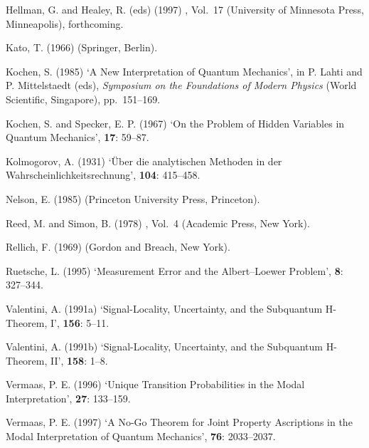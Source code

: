 \documentclass[12pt]{article}
\begin{document}
\begin{thebibliography}{10}
Hellman, G. and Healey, R. (eds) (1997)
, Vol.~17 (University of
Minnesota Press, Minneapolis), forthcoming.

Kato, T.  (1966)
(Springer, Berlin).

Kochen, S.  (1985)
\newblock `A New Interpretation of Quantum Mechanics',
\newblock in P. Lahti and P. Mittelstaedt (eds),
{\em Symposium on the Foundations of Modern Physics}
\newblock (World Scientific, Singapore), \mbox{pp. 151--169}.

Kochen, S. and Specker, E. P. (1967)
\newblock `On the Problem of Hidden Variables in Quantum Mechanics',
 {\bf 17}: 59--87.

Kolmogorov, A. (1931)
\newblock `\"Uber die analytischen Methoden in der
Wahrscheinlichkeitsrechnung',
 {\bf 104}: 415--458.

Nelson, E. (1985)
\newblock (Princeton University Press, Princeton).

Reed, M. and Simon, B.  (1978)
, Vol.~4
(Academic Press, New York).

Rellich, F. (1969)
 (Gordon and
Breach, New York).

Ruetsche, L.  (1995)
\newblock `Measurement Error and the Albert--Loewer Problem',
 {\bf 8}: 327--344.

Valentini, A. (1991a)
\newblock `Signal-Locality, Uncertainty, and the Subquantum H-Theorem, I',
 {\bf 156}: 5--11.

Valentini, A. (1991b)
\newblock `Signal-Locality, Uncertainty, and the Subquantum H-Theorem, II',
 {\bf 158}: 1--8.

Vermaas, P. E. (1996)
\newblock `Unique Transition Probabilities in the Modal Interpretation',
 {\bf 27}: 133--159.

Vermaas, P. E. (1997)
\newblock `A No-Go Theorem for Joint Property Ascriptions in the
Modal Interpretation of Quantum Mechanics',
 {\bf 76}: 2033--2037.


\end{thebibliography}
\end{document}
